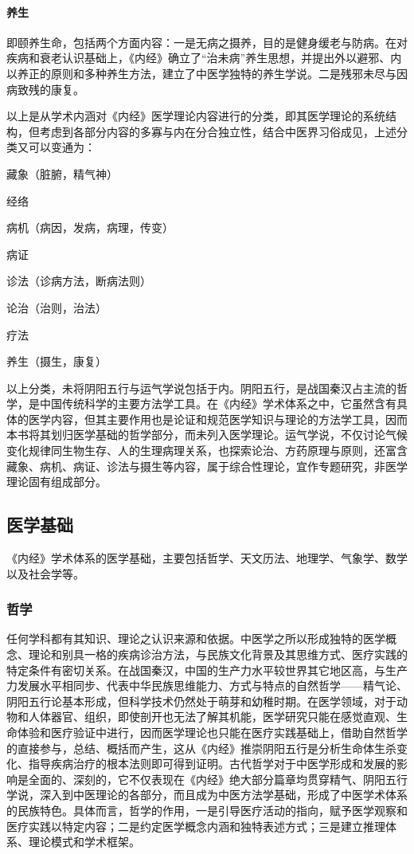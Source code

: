 \documentclass[draft,12pt]{ctexbook}
\begin{document}
\paragraph{养生}	即颐养生命，包括两个方面内容：一是无病之摄养，目的是健身缓老与防病。在对疾病和衰老认识基础上，《内经》确立了“治未病”养生思想，并提出外以避邪、内以养正的原则和多种养生方法，建立了中医学独特的养生学说。二是残邪未尽与因病致残的康复。

以上是从学术内涵对《内经》医学理论内容进行的分类，即其医学理论的系统结构，但考虑到各部分内容的多寡与内在分合独立性，结合中医界习俗成见，上述分类又可以变通为：

藏象（脏腑，精气神）

经络

病机（病因，发病，病理，传变）

病证

诊法（诊病方法，断病法则）

论治（治则，治法）

疗法

养生（摄生，康复）

以上分类，未将阴阳五行与运气学说包括于内。阴阳五行，是战国秦汉占主流的哲学，是中国传统科学的主要方法学工具。在《内经》学术体系之中，它虽然含有具体的医学内容，但其主要作用也是论证和规范医学知识与理论的方法学工具，因而本书将其划归医学基础的哲学部分，而未列入医学理论。运气学说，不仅讨论气候变化规律同生物生存、人的生理病理关系，也探索论治、方药原理与原则，还富含藏象、病机、病证、诊法与摄生等内容，属于综合性理论，宜作专题研究，非医学理论固有组成部分。

\subsection{医学基础} %

《内经》学术体系的医学基础，主要包括哲学、天文历法、地理学、气象学、数学以及社会学等。

\subsubsection{哲学}%

任何学科都有其知识、理论之认识来源和依据。中医学之所以形成独特的医学概念、理论和别具一格的疾病诊治方法，与民族文化背景及其思维方式、医疗实践的特定条件有密切关系。在战国秦汉，中国的生产力水平较世界其它地区高，与生产力发展水平相同步、代表中华民族思维能力、方式与特点的自然哲学——精气论、阴阳五行论基本形成，但科学技术仍然处于萌芽和幼稚时期。在医学领域，对于动物和人体器官、组织，即使剖开也无法了解其机能，医学研究只能在感觉直观、生命体验和医疗验证中进行，因而医学理论也只能在医疗实践基础上，借助自然哲学的直接参与，总结、概括而产生，这从《内经》推崇阴阳五行是分析生命体生杀变化、指导疾病治疗的根本法则即可得到证明。古代哲学对于中医学形成和发展的影响是全面的、深刻的，它不仅表现在《内经》绝大部分篇章均贯穿精气、阴阳五行学说，深入到中医理论的各部分，而且成为中医方法学基础，形成了中医学术体系的民族特色。具体而言，哲学的作用，一是引导医疗活动的指向，赋予医学观察和医疗实践以特定内容；二是约定医学概念内涵和独特表述方式；三是建立推理体系、理论模式和学术框架。
\end{document}
